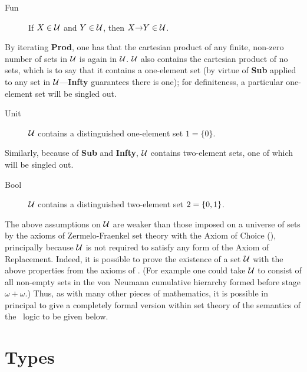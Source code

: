 \begin{description}

\item[Fun] If $X\in{\cal U}$ and $Y\in{\cal U}$, then $X{\to} Y\in{\cal U}$.

\end{description}
By iterating {\bf Prod}, one has that the cartesian product of any
finite, non-zero number of sets in $\cal U$ is again in $\cal U$.
$\cal U$ also contains the cartesian product of no sets, which is to
say that it contains a one-element set (by virtue of {\bf Sub} applied
to any set in ${\cal U}$---{\bf Infty} guarantees there is one); for
definiteness, a particular one-element set will be singled out.
\begin{description}

\item[Unit] $\cal U$ contains a distinguished one-element set $1=\{0\}$.

\end{description}
Similarly, because of {\bf Sub} and {\bf Infty}, $\cal U$ contains
two-element sets, one of which will be singled out.
\begin{description}

\item[Bool] $\cal U$ contains a distinguished two-element set
$\mbox{\rm 2}=\{0,1\}$.

\end{description}

The above assumptions on $\cal U$ are weaker than those imposed on a
universe of sets by the axioms of
Zermelo-Fraenkel set theory with the
Axiom of Choice (),
principally because $\cal U$ is not
required to satisfy any form of the Axiom of
Replacement.
Indeed, it is possible to prove the existence of a set
$\cal U$ with the above properties from the axioms of .
(For example one could take $\cal U$ to consist of all non-empty sets
in the von~Neumann cumulative hierarchy formed before stage
$\omega+\omega$.) Thus, as with many other pieces of mathematics, it is
possible in principal to give a completely formal version within
 set theory of the semantics of the \HOL\ logic to be given
below.

\section{Types}
\label{types}

